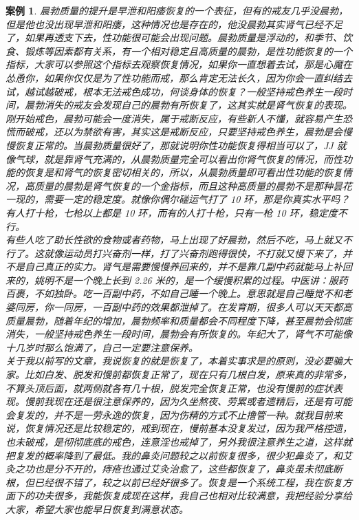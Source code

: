 \documentclass[fontset=founder]{ctexart}
\newtheorem{case}{案例}
\begin{document}
\begin{case}
    晨勃质量的提升是早泄和阳痿恢复的一个表征，但有的戒友几乎没晨勃，但是他也没出现早泄和阳痿，这种情况也是存在的，他没晨勃其实肾气已经不足了，如果再透支下去，性功能很可能会出现问题。晨勃质量是浮动的，和季节、饮食、锻炼等因素都有关系，有一个相对稳定且高质量的晨勃，是性功能恢复的一个指标，大家可以参照这个指标去观察恢复情况，如果你一直想着去试，那是心魔在怂恿你，如果你仅仅是为了性功能而戒，那么肯定无法长久，因为你会一直纠结去试，越试越破戒，根本无法戒色成功，何谈身体的恢复？一般坚持戒色养生一段时间，晨勃消失的戒友会发现自己的晨勃有所恢复了，这其实就是肾气恢复的表现。刚开始戒色，晨勃可能会一度消失，属于戒断反应，有些新人不懂，就容易产生恐慌而破戒，还以为禁欲有害，其实这是戒断反应，只要坚持戒色养生，晨勃是会慢慢恢复正常的。当晨勃质量很好了，那就说明你性功能恢复得相当可以了，JJ 就像气球，就是靠肾气充满的，从晨勃质量完全可以看出你肾气恢复的情况，而性功能的恢复是和肾气的恢复密切相关的，所以，从晨勃质量即可看出性功能的恢复情况，高质量的晨勃是肾气恢复的一个金指标，而且这种高质量的晨勃不是那种昙花一现的，需要一定的稳定度。就像你偶尔碰运气打了 10 环，那是你真实水平吗？有人打十枪，七枪以上都是 10 环，而有的人打十枪，只有一枪 10 环，稳定度不行。\\
    有些人吃了助长性欲的食物或者药物，马上出现了好晨勃，然后不吃，马上就又不行了。这就像运动员打兴奋剂一样，打了兴奋剂跑得很快，不打就又慢下来了，并不是自己真正的实力。肾气是需要慢慢养回来的，并不是靠几副中药就能马上补回来的，姚明不是一个晚上长到 2.26 米的，是一个缓慢积累的过程。中医讲：服药百裹，不如独卧。吃一百副中药，不如自己睡一个晚上。意思就是自己睡觉不和老婆同房，你一同房，一百副中药的效果都泄掉了。在发育期，很多人可以天天都高质量晨勃，随着年纪的增加，晨勃频率和质量都会不同程度下降，甚至晨勃会彻底消失，一般坚持戒色养生一段时间，晨勃会有所恢复的。年纪大了，肾气不可能像十几岁时那么饱满了，自己一定要注意保养。\\
    关于我以前写的文章，我说恢复的就是恢复了，本着实事求是的原则，没必要骗大家。比如白发、脱发和慢前都恢复正常了，现在只有几根白发，原来真的非常多，不算头顶后面，就两侧就各有几十根，脱发完全恢复正常，也没有慢前的症状表现。慢前我现在还是很注意保养的，因为久坐熬夜、劳累或者遗精后，还是有可能会复发的，并不是一劳永逸的恢复，因为伤精的方式不止撸管一种。就我目前来说，恢复情况还是比较稳定的，戒到现在，慢前基本没复发过，因为我严格控遗，也未破戒，是彻彻底底的戒色，连意淫也戒掉了，另外我很注意养生之道，这样就把复发的概率降到了最低。我的鼻炎问题较之以前恢复很多，很少犯鼻炎了，和艾灸之功也是分不开的，痔疮也通过艾灸治愈了，这些都恢复了，鼻炎虽未彻底断根，但已经很不错了，较之以前已经好很多了。恢复是一个系统工程，我在恢复方面下的功夫很多，我能恢复成现在这样，我自己也相对比较满意，我把经验分享给大家，希望大家也能早日恢复到满意状态。\\

\end{case}
\end{document}
